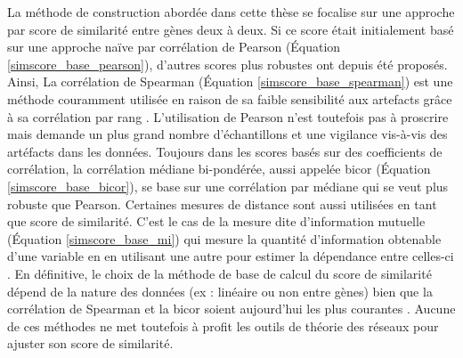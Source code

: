 La méthode de construction abordée dans cette thèse se focalise sur une approche par score de similarité entre gènes deux à deux. Si ce score était initialement basé sur une approche naïve par corrélation de Pearson \cite{Carter2004} (Équation \ref{simscore_base_pearson}), d'autres scores plus robustes ont depuis été proposés. Ainsi, La corrélation de Spearman (Équation \ref{simscore_base_spearman}) est une méthode couramment utilisée en raison de sa faible sensibilité aux artefacts grâce à sa corrélation par rang \cite{Chowdhury2019,Serin2016,Kuehne2017}. L'utilisation de Pearson n'est toutefois pas à proscrire mais demande un plus grand nombre d'échantillons et une vigilance vis-à-vis des artéfacts dans les données. Toujours dans les scores basés sur des coefficients de corrélation, la corrélation médiane bi-pondérée, aussi appelée bicor \cite{Song2012} (Équation \ref{simscore_base_bicor}), se base sur une corrélation par médiane qui se veut plus robuste que Pearson. Certaines mesures de distance sont aussi utilisées en tant que score de similarité. C'est le cas de la mesure dite d'information mutuelle (Équation \ref{simscore_base_mi}) qui mesure la quantité d'information obtenable d'une variable en en utilisant une autre pour estimer la dépendance entre celles-ci \cite{Kullback1997}. En définitive, le choix de la méthode de base de calcul du score de similarité dépend de la nature des données (ex : linéaire ou non entre gènes) bien que la corrélation de Spearman et la bicor soient aujourd'hui les plus courantes \cite{Serin2016}. Aucune de ces méthodes ne met toutefois à profit les outils de théorie des réseaux pour ajuster son score de similarité.


